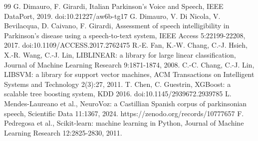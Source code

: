 \documentclass[11pt,a4paper]{article}
\begin{document}
\begin{thebibliography}{99}
 G. Dimauro, F. Girardi, Italian Parkinson's Voice and Speech, IEEE DataPort, 2019. doi:10.21227/aw6b-tg17
 G. Dimauro, V. Di Nicola, V. Bevilacqua, D. Caivano, F. Girardi, Assessment of speech intelligibility in Parkinson's disease using a speech-to-text system, IEEE Access 5:22199-22208, 2017. doi:10.1109/ACCESS.2017.2762475
 R.-E. Fan, K.-W. Chang, C.-J. Hsieh, X.-R. Wang, C.-J. Lin, LIBLINEAR: a library for large linear classification, Journal of Machine Learning Research 9:1871-1874, 2008.
 C.-C. Chang, C.-J. Lin, LIBSVM: a library for support vector machines, ACM Transactions on Intelligent Systems and Technology 2(3):27, 2011.
 T. Chen, C. Guestrin, XGBoost: a scalable tree boosting system, KDD 2016. doi:10.1145/2939672.2939785
 L. Mendes-Laureano et al., NeuroVoz: a Castillian Spanish corpus of parkinsonian speech, Scientific Data 11:1367, 2024. https://zenodo.org/records/10777657
 F. Pedregosa et al., Scikit-learn: machine learning in Python, Journal of Machine Learning Research 12:2825-2830, 2011.
\end{thebibliography}
\end{document}

